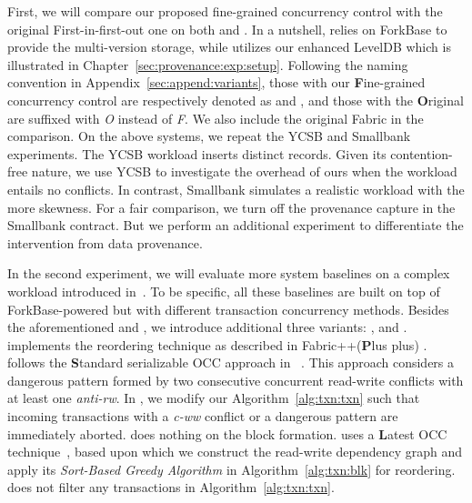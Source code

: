 First, we will compare our proposed fine-grained concurrency control with the original First-in-first-out one on both {\fs} and {\fsPr}. 
In a nutshell, {\fs} relies on ForkBase to provide the multi-version storage, while {\fsPr} utilizes our enhanced LevelDB which is illustrated in Chapter~\ref{sec:provenance:exp:setup}. 
Following the naming convention in Appendix~\ref{sec:append:variants}, those with our \textbf{F}ine-grained concurrency control are respectively denoted as {\fsF} and {\fsPrF}, and those with the \textbf{O}riginal are suffixed with \textit{O} instead of \textit{F}. 
We also include the original Fabric in the comparison. 
On the above systems, we repeat the YCSB and Smallbank experiments. 
The YCSB workload inserts distinct records. 
Given its contention-free nature, we use YCSB to investigate the overhead of ours when the workload entails no conflicts. 
In contrast, Smallbank simulates a realistic workload with the more skewness.
For a fair comparison, we turn off the provenance capture in the Smallbank contract. 
But we perform an additional experiment to differentiate the intervention from data provenance.

In the second experiment, we will evaluate more system baselines on a complex workload introduced in~\cite{sharma2019blurring}. 
To be specific, all these baselines are built on top of ForkBase-powered {\fs} but with different transaction concurrency methods.
Besides the aforementioned {\fsO} and {\fsF}, we introduce additional three variants: {\fsP}, {\fsL} and {\fsS}. 
{\fsP} implements the reordering technique as described in Fabric++(\textbf{P}lus plus) \cite{sharma2019blurring}.
{\fsS} follows the \textbf{S}tandard serializable OCC approach in ~\cite{CahillRF08}. 
This approach considers a dangerous pattern formed by two consecutive concurrent read-write conflicts with at least one \textit{anti-rw}. 
In {\fsS}, we modify our Algorithm~\ref{alg:txn:txn} such that incoming transactions with a \textit{c-ww} conflict or a dangerous pattern are immediately aborted. 
{\fsS} does nothing on the block formation.
{\fsL} uses a \textbf{L}atest OCC technique~\cite{ding2018improving}, based upon which we construct the read-write
dependency graph and apply its \textit{Sort-Based Greedy Algorithm} in Algorithm~\ref{alg:txn:blk} for reordering. 
{\fsL} does not filter any transactions in Algorithm~\ref{alg:txn:txn}.

